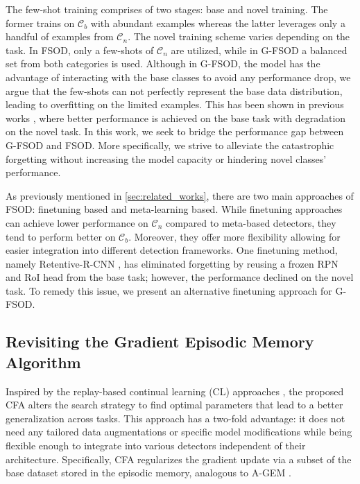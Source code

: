 \documentclass[10pt,twocolumn,letterpaper]{article}
\begin{document}
The few-shot training comprises of two stages: base and novel training. The former trains on $\mathcal{C}_b$ with abundant examples whereas the latter leverages only a handful of examples from $\mathcal{C}_n$. The novel training scheme varies depending on the task. In FSOD, only a few-shots of $\mathcal{C}_n$ are utilized, while in G-FSOD a balanced set from both categories is used. 
Although in G-FSOD, the model has the advantage of interacting with the base classes to avoid any performance drop, we argue that the few-shots can not perfectly represent the base data distribution, leading to overfitting on the limited examples. This has been shown in previous works \cite{TFA, gfsod, defrcn}, where better performance is achieved on the base task with degradation on the novel task. In this work, we seek to bridge the performance gap between G-FSOD and FSOD. More specifically, we strive to alleviate the catastrophic forgetting without increasing the model capacity or hindering novel classes' performance.

As previously mentioned in \cref{sec:related_works}, there are two main approaches of FSOD: finetuning based and meta-learning based. While finetuning approaches can achieve lower performance on $\mathcal{C}_n$ compared to meta-based detectors, they tend to perform better on $\mathcal{C}_b$. Moreover, they offer more flexibility allowing for easier integration into different detection frameworks. One finetuning method, namely Retentive-R-CNN \cite{gfsod}, has eliminated forgetting by reusing a frozen RPN and RoI head from the base task; however, the performance declined on the novel task. To remedy this issue, we present an alternative finetuning approach for G-FSOD.  


\subsection{Revisiting the Gradient Episodic Memory Algorithm}
\label{subsec:constrained_approach}
Inspired by the replay-based continual learning (CL) approaches \cite{gem, agem}, the proposed CFA alters the search strategy to find optimal parameters that lead to a better generalization across tasks. This approach has a two-fold advantage: it does not need any tailored data augmentations or specific model modifications while being flexible enough to integrate into various detectors independent of their architecture. Specifically, CFA regularizes the gradient update via a subset of the base dataset stored in the episodic memory, analogous to A-GEM \cite{agem}. 
\end{document}
